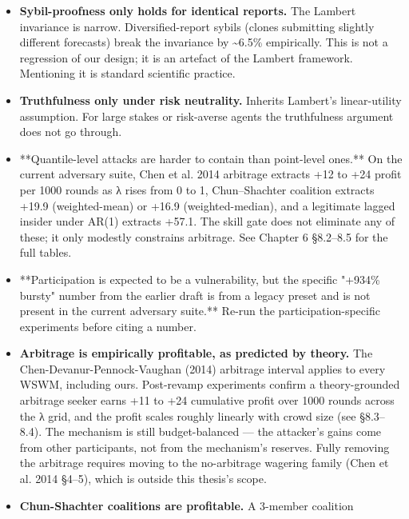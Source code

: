 \documentclass[11pt,a4paper,openany]{report}
\begin{document}
\begin{itemize}
    Gneiting 2010: any non-trivial weighted average of distinct
    calibrated forecasts is necessarily uncalibrated. The mechanism's
    aggregate shows \textasciitilde{}2pp systematic tail deviation. The recalibration
    layer closes 59\% of this; 41\% remains.
  \item \textbf{Sybil-proofness only holds for identical reports.} The Lambert
    invariance is narrow. Diversified-report sybils (clones submitting
    slightly different forecasts) break the invariance by \textasciitilde{}6.5\%
    empirically. This is not a regression of our design; it is an
    artefact of the Lambert framework. Mentioning it is standard
    scientific practice.
  \item \textbf{Truthfulness only under risk neutrality.} Inherits Lambert's
    linear-utility assumption. For large stakes or risk-averse agents
    the truthfulness argument does not go through.
  \item **Quantile-level attacks are harder to contain than point-level
    ones.** On the current adversary suite, Chen et al. 2014 arbitrage
    extracts +12 to +24 profit per 1000 rounds as λ rises from 0 to 1,
    Chun–Shachter coalition extracts +19.9 (weighted-mean) or +16.9
    (weighted-median), and a legitimate lagged insider under AR(1)
    extracts +57.1. The skill gate does not eliminate any of these;
    it only modestly constrains arbitrage. See Chapter 6 §8.2–8.5 for
    the full tables.
  \item **Participation is expected to be a vulnerability, but the specific
    "+934\% bursty" number from the earlier draft is from a legacy
    preset and is not present in the current adversary suite.** Re-run
    the participation-specific experiments before citing a number.
  \item \textbf{Arbitrage is empirically profitable, as predicted by theory.}
    The Chen-Devanur-Pennock-Vaughan (2014) arbitrage interval applies
    to every WSWM, including ours. Post-revamp experiments confirm a
    theory-grounded arbitrage seeker earns +11 to +24 cumulative profit
    over 1000 rounds across the λ grid, and the profit scales roughly
    linearly with crowd size (see §8.3–8.4). The mechanism is still
    budget-balanced — the attacker's gains come from other
    participants, not from the mechanism's reserves. Fully removing the
    arbitrage requires moving to the no-arbitrage wagering family
    (Chen et al. 2014 §4–5), which is outside this thesis's scope.
  \item \textbf{Chun-Shachter coalitions are profitable.} A 3-member coalition

\end{itemize}
\end{document}
